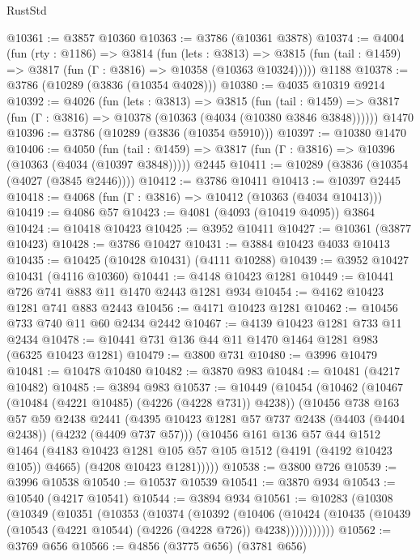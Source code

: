 \begin{lexlean}{RustStd}
\begin{coremodule}
@10361 := @3857 @10360
@10363 := @3786 (@10361 @3878)
@10374 := @4004
    (fun (rty : @1186) =>
    @3814
      (fun (lets : @3813) =>
      @3815 (fun (tail : @1459) => @3817 (fun (Γ : @3816) => @10358 (@10363 @10324)))))
    @1188
@10378 := @3786 (@10289 (@3836 (@10354 @4028)))
@10380 := @4035 @10319 @9214
@10392 := @4026
    (fun (lets : @3813) =>
    @3815
      (fun (tail : @1459) =>
      @3817 (fun (Γ : @3816) => @10378 (@10363 (@4034 (@10380 @3846 @3848))))))
    @1470
@10396 := @3786 (@10289 (@3836 (@10354 @5910)))
@10397 := @10380 @1470
@10406 := @4050
    (fun (tail : @1459) => @3817 (fun (Γ : @3816) => @10396 (@10363 (@4034 (@10397 @3848)))))
    @2445
@10411 := @10289 (@3836 (@10354 (@4027 (@3845 @2446))))
@10412 := @3786 @10411
@10413 := @10397 @2445
@10418 := @4068 (fun (Γ : @3816) => @10412 (@10363 (@4034 @10413)))
@10419 := @4086 @57
@10423 := @4081 (@4093 (@10419 @4095)) @3864
@10424 := @10418 @10423
@10425 := @3952 @10411
@10427 := @10361 (@3877 @10423)
@10428 := @3786 @10427
@10431 := @3884 @10423 @4033 @10413
@10435 := @10425 (@10428 @10431) (@4111 @10288)
@10439 := @3952 @10427 @10431 (@4116 @10360)
@10441 := @4148 @10423 @1281
@10449 := @10441 @726 @741 @883 @11 @1470 @2443 @1281 @934
@10454 := @4162 @10423 @1281 @741 @883 @2443
@10456 := @4171 @10423 @1281
@10462 := @10456 @733 @740 @11 @60 @2434 @2442
@10467 := @4139 @10423 @1281 @733 @11 @2434
@10478 := @10441 @731 @136 @44 @11 @1470 @1464 @1281 @983 (@6325 @10423 @1281)
@10479 := @3800 @731
@10480 := @3996 @10479
@10481 := @10478 @10480
@10482 := @3870 @983
@10484 := @10481 (@4217 @10482)
@10485 := @3894 @983
@10537 := @10449
    (@10454
      (@10462
        (@10467 (@10484 (@4221 @10485) (@4226 (@4228 @731)) @4238))
        (@10456
          @738
          @163
          @57
          @59
          @2438
          @2441
          (@4395 @10423 @1281 @57 @737 @2438 (@4403 (@4404 @2438)) (@4232 (@4409 @737 @57)))
          (@10456
            @161
            @136
            @57
            @44
            @1512
            @1464
            (@4183 @10423 @1281 @105 @57 @105 @1512 (@4191 (@4192 @10423 @105)) @4665)
            (@4208 @10423 @1281)))))
@10538 := @3800 @726
@10539 := @3996 @10538
@10540 := @10537 @10539
@10541 := @3870 @934
@10543 := @10540 (@4217 @10541)
@10544 := @3894 @934
@10561 := @10283
    (@10308
      (@10349
        (@10351
          (@10353
            (@10374
              (@10392
                (@10406
                  (@10424
                    (@10435 (@10439 (@10543 (@4221 @10544) (@4226 (@4228 @726)) @4238)))))))))))
@10562 := @3769 @656
@10566 := @4856 (@3775 @656) (@3781 @656)

\end{coremodule}
\end{lexlean}

